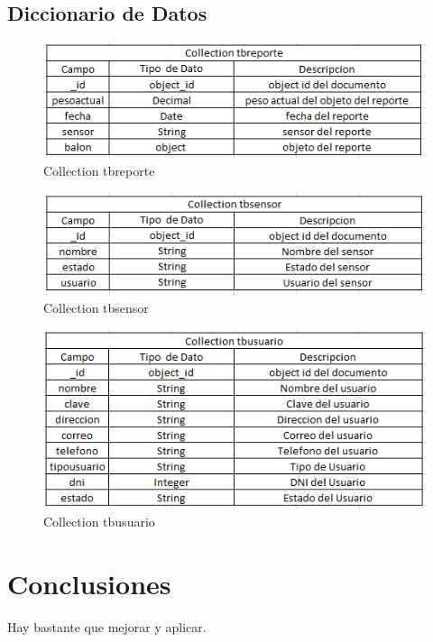 \documentclass[twoside,twocolumn]{article}
\begin{document}
\begin{itemize}
\clearpage

\subsection{Diccionario de Datos}

\begin{figure}[h!]
\centering
\includegraphics[scale=0.50]{Image/Collection tbreporte.PNG}
\caption{Collection tbreporte}
\label{fig:Csha3}
\end{figure}

\begin{figure}[h!]
\centering
\includegraphics[scale=0.50]{Image/Collection tbsensor.PNG}
\caption{Collection tbsensor}
\label{fig:Csha3}
\end{figure}

\begin{figure}[h!]
\centering
\includegraphics[scale=0.50]{Image/Collection tbusuario.PNG}
\caption{Collection tbusuario}
\label{fig:Csha3}
\end{figure}


\section{Conclusiones}
Hay bastante que mejorar y aplicar.


\end{itemize}
\end{document}
